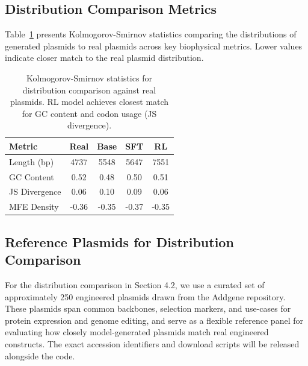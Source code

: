 \documentclass{article}
\theoremstyle{plain}
\theoremstyle{definition}
\theoremstyle{remark}
\begin{document}
\subsection{Distribution Comparison Metrics}

Table~\ref{tab:ks_stats} presents Kolmogorov-Smirnov statistics
comparing the distributions of generated plasmids to real plasmids
across key biophysical metrics. Lower values indicate closer match to
the real plasmid distribution.

\begin{table}[h]
\caption{Kolmogorov-Smirnov statistics for distribution comparison
against real plasmids. RL model achieves closest match for GC content
and codon usage (JS divergence).}
\label{tab:ks_stats}
\vskip 0.15in
\begin{center}
\begin{small}
\begin{sc}
\begin{tabular}{lcccc}
\toprule
Metric & Real & Base & SFT & RL \\
\midrule
Length (bp) & 4737 & 5548 & 5647 & 7551 \\
GC Content & 0.52 & 0.48 & 0.50 & 0.51 \\
JS Divergence & 0.06 & 0.10 & 0.09 & 0.06 \\
MFE Density & -0.36 & -0.35 & -0.37 & -0.35 \\
\bottomrule
\end{tabular}
\end{sc}
\end{small}
\end{center}
\vskip -0.1in
\end{table}

\subsection{Reference Plasmids for Distribution Comparison}

For the distribution comparison in Section 4.2, we use a curated set of
approximately 250 engineered plasmids drawn from the Addgene repository.
These plasmids span common backbones, selection markers, and use-cases
for protein expression and genome editing, and serve as a flexible
reference panel for evaluating how closely model-generated plasmids
match real engineered constructs. The exact accession identifiers and
download scripts will be released alongside the code.




\end{document}
